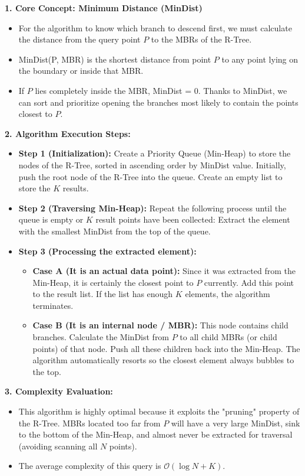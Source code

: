 \documentclass[a4paper, 10pt, titlepage]{report}
\begin{document}
\textbf{1. Core Concept: Minimum Distance (MinDist)}
\begin{itemize}
    \item For the algorithm to know which branch to descend first, we must calculate the distance from the query point $P$ to the MBRs of the R-Tree.
    \item MinDist(P, MBR) is the shortest distance from point $P$ to any point lying on the boundary or inside that MBR.
    \item If $P$ lies completely inside the MBR, MinDist = 0. Thanks to MinDist, we can sort and prioritize opening the branches most likely to contain the points closest to $P$.
\end{itemize}

\textbf{2. Algorithm Execution Steps:}
\begin{itemize}
    \item \textbf{Step 1 (Initialization):} Create a Priority Queue (Min-Heap) to store the nodes of the R-Tree, sorted in ascending order by MinDist value. Initially, push the root node of the R-Tree into the queue. Create an empty list to store the $K$ results.
    \item \textbf{Step 2 (Traversing Min-Heap):} Repeat the following process until the queue is empty or $K$ result points have been collected: Extract the element with the smallest MinDist from the top of the queue.
    \item \textbf{Step 3 (Processing the extracted element):}
    \begin{itemize}
        \item \textbf{Case A (It is an actual data point):} Since it was extracted from the Min-Heap, it is certainly the closest point to $P$ currently. Add this point to the result list. If the list has enough $K$ elements, the algorithm terminates.
        \item \textbf{Case B (It is an internal node / MBR):} This node contains child branches. Calculate the MinDist from $P$ to all child MBRs (or child points) of that node. Push all these children back into the Min-Heap. The algorithm automatically resorts so the closest element always bubbles to the top.
    \end{itemize}
\end{itemize}

\textbf{3. Complexity Evaluation:}
\begin{itemize}
    \item This algorithm is highly optimal because it exploits the "pruning" property of the R-Tree. MBRs located too far from $P$ will have a very large MinDist, sink to the bottom of the Min-Heap, and almost never be extracted for traversal (avoiding scanning all $N$ points).
    \item The average complexity of this query is $\mathcal{O}(\log N + K)$.
\end{itemize}
\end{document}
